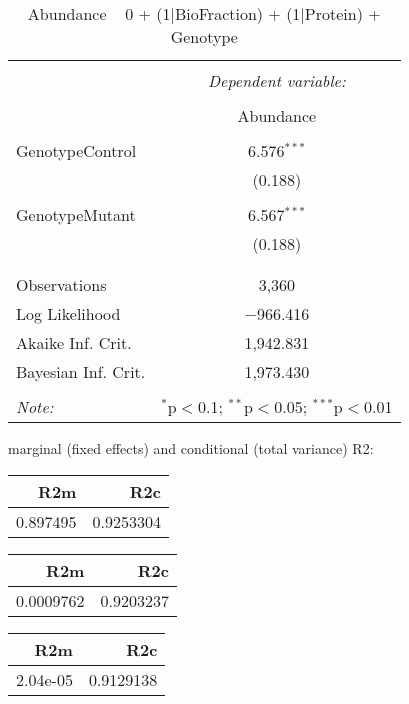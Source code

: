 \documentclass[11pt]{report}
\begin{document}
\begin{table}[!htbp] \centering 
  \caption{Abundance ~ 0 + (1|BioFraction) + (1|Protein) + Genotype} 
  \label{} 
\begin{tabular}{@{\extracolsep{5pt}}lc} 
\\[-1.8ex]\hline 
\hline \\[-1.8ex] 
 & \multicolumn{1}{c}{\textit{Dependent variable:}} \\ 
\cline{2-2} 
\\[-1.8ex] & Abundance \\ 
\hline \\[-1.8ex] 
 GenotypeControl & 6.576$^{***}$ \\ 
  & (0.188) \\ 
  & \\ 
 GenotypeMutant & 6.567$^{***}$ \\ 
  & (0.188) \\ 
  & \\ 
\hline \\[-1.8ex] 
Observations & 3,360 \\ 
Log Likelihood & $-$966.416 \\ 
Akaike Inf. Crit. & 1,942.831 \\ 
Bayesian Inf. Crit. & 1,973.430 \\ 
\hline 
\hline \\[-1.8ex] 
\textit{Note:}  & \multicolumn{1}{r}{$^{*}$p$<$0.1; $^{**}$p$<$0.05; $^{***}$p$<$0.01} \\ 
\end{tabular} 
\end{table} 
marginal (fixed effects) and conditional (total variance) R2:

\begin{tabular}{r|r}
\hline
R2m & R2c\\
\hline
0.897495 & 0.9253304\\
\hline
\end{tabular}

\begin{tabular}{r|r}
\hline
R2m & R2c\\
\hline
0.0009762 & 0.9203237\\
\hline
\end{tabular}

\begin{tabular}{r|r}
\hline
R2m & R2c\\
\hline
2.04e-05 & 0.9129138\\
\hline
\end{tabular}
\end{document}

